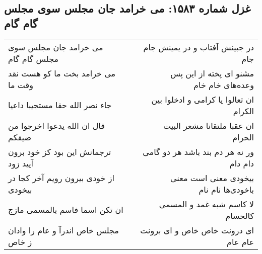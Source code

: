 \begin{center}
\section*{غزل شماره ۱۵۸۳: می خرامد جان مجلس سوی مجلس گام گام}
\label{sec:1583}
\begin{longtable}{l p{0.5cm} r}
می خرامد جان مجلس سوی مجلس گام گام
&&
در جبینش آفتاب و در یمینش جام جام
\\
می خرامد بخت ما کو هست نقد وقت ما
&&
مشنو ای پخته از این پس وعده‌های خام خام
\\
جاء نصر الله حقا مستجیبا داعیا
&&
ان تعالوا یا کرامی و ادخلوا بین الکرام
\\
قال ان الله یدعوا اخرجوا من ضیقکم
&&
ان عقبا ملتقانا مشعر البیت الحرام
\\
ترجمانش این بود کز خود برون آیید زود
&&
ور نه هر دم بند باشد هر دو گامی دام دام
\\
از خودی بیرون رویم آخر کجا در بیخودی
&&
بیخودی معنی است معنی باخودی‌ها نام نام
\\
ان تکن اسما فاسم بالمسمی مازج
&&
لا کاسم شبه غمد و المسمی کالحسام
\\
مجلس خاص اندرآ و عام را وادان ز خاص
&&
ای درونت خاص خاص و ای برونت عام عام
\\
\end{longtable}
\end{center}
